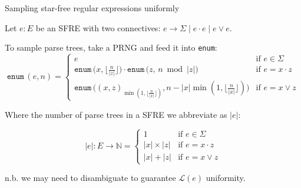 \documentclass{beamer}
\begin{document}
\begin{frame}{Sampling star-free regular expressions uniformly}
  \vspace{-0.3cm}

  Let \( e: E \) be an SFRE with two connectives: $ e \rightarrow \Sigma \mid e \cdot e \mid e \lor e $.

  \begin{theorem}
    To sample parse trees, take a PRNG and feed it into \texttt{enum}:
    \begin{equation*}
      \texttt{enum}\,(e, n) = \begin{cases}
        e &\text{if } e \in \Sigma \\
        \texttt{enum}\,\big(x, \lfloor \frac{n}{|z|} \rfloor\big) \cdot \texttt{enum}\,\big(z,\, n \bmod |z|\big)  &\text{if } e = x \cdot z \\
        \texttt{enum}\,\big((x, z)_{\min(1, \lfloor\frac{n}{|x|}\rfloor)}, n-|x|\min(1, \lfloor\frac{n}{|x|}\rfloor)\big) &\text{if } e = x \vee z
      \end{cases}
    \end{equation*}

    Where the number of parse trees in a SFRE we abbreviate as $|e|$:

    \begin{equation*}
      |e|: E \rightarrow \mathbb{N} = \begin{cases}
        1           & \text{if } e \in \Sigma \\
        |x| \times |z|  & \text{if } e = x \cdot z \\
        |x| + |z|       & \text{if } e = x \vee z
      \end{cases}
    \end{equation*}

    n.b. we may need to disambiguate to guarantee $\mathcal{L}(e)$ uniformity.
  \end{theorem}
\end{frame}
\end{document}
